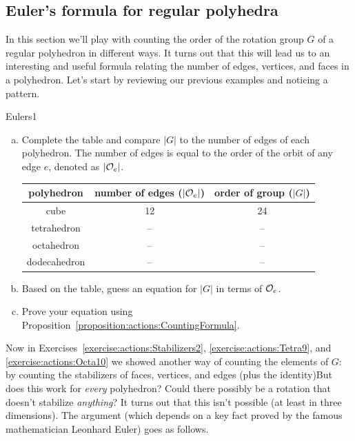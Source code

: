 \subsection{Euler's formula for regular polyhedra}\label{sec:actions:Euler}
In this section we'll play with counting the order of the rotation group $G$ of a regular polyhedron in different ways. It turns out that this will lead us to an interesting and useful formula relating the number of edges, vertices, and faces in a polyhedron.
Let's start by reviewing our previous examples and noticing a pattern.

\begin{exercise}{Eulers1}
\begin{enumerate}[(a)]
\item
Complete the table and compare $|G|$ to the number of edges of each polyhedron.  The number of edges is equal to the order of the orbit of any edge $e$, denoted as $|{\cal O}_e|$.

\begin{tabular}{|c | c | c|}\hline
polyhedron & number of edges ($|{\cal O}_e|$) & order of group ($|G|$)\\ \hline
cube &  12 &   24\\ \hline
tetrahedron &  -- &   --\\ \hline
octahedron & -- &--\\ \hline
dodecahedron &  --&--\\ \hline 
\end{tabular}
\item Based on the table, guess an equation for $|G|$ in terms of ${\cal O}_e$.
\item 
Prove your equation using Proposition~\ref{proposition:actions:CountingFormula}.
\end{enumerate}
\end {exercise}
 Now in Exercises~\ref{exercise:actions:Stabilizers2}, \ref{exercise:actions:Tetra9}, and \ref{exercise:actions:Octa10}  we showed another way of counting the elements of $G$: by counting the stabilizers of faces, vertices, and edges (plus the identity)But does this work for \emph{every} polyhedron? Could there possibly be a rotation that doesn't stabilize \emph{anything}? It turns out that this isn't possible (at least in three dimensions). The argument (which depends on a key fact proved by the famous mathematician Leonhard Euler) goes as follows. 

